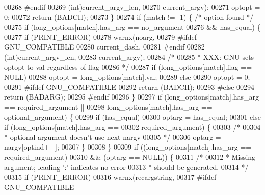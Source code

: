 \begin{DoxyCode}
{{{{{{{{{{{00268 #endif
00269                  (\textcolor{keywordtype}{int})current\_argv\_len,
00270                  current\_argv);
00271         optopt = 0;
00272         \textcolor{keywordflow}{return} (BADCH);
00273     \}
00274     \textcolor{keywordflow}{if} (match != -1) \{      \textcolor{comment}{/* option found */}
00275         \textcolor{keywordflow}{if} (long\_options[match].has\_arg == no\_argument
00276             && has\_equal) \{
00277             \textcolor{keywordflow}{if} (PRINT\_ERROR)
00278                 warnx(noarg,
00279 #ifdef GNU\_COMPATIBLE
00280                      current\_dash,
00281 #endif
00282                      (\textcolor{keywordtype}{int})current\_argv\_len,
00283                      current\_argv);
00284             \textcolor{comment}{/*}
00285 \textcolor{comment}{             * XXX: GNU sets optopt to val regardless of flag}
00286 \textcolor{comment}{             */}
00287             \textcolor{keywordflow}{if} (long\_options[match].flag == NULL)
00288                 optopt = long\_options[match].val;
00289             \textcolor{keywordflow}{else}
00290                 optopt = 0;
00291 \textcolor{preprocessor}{#ifdef GNU\_COMPATIBLE}
00292             \textcolor{keywordflow}{return} (BADCH);
00293 \textcolor{preprocessor}{#else}
00294             \textcolor{keywordflow}{return} (BADARG);
00295 \textcolor{preprocessor}{#endif}
00296         \}
00297         \textcolor{keywordflow}{if} (long\_options[match].has\_arg == required\_argument ||
00298             long\_options[match].has\_arg == optional\_argument) \{
00299             \textcolor{keywordflow}{if} (has\_equal)
00300                 optarg = has\_equal;
00301             \textcolor{keywordflow}{else} \textcolor{keywordflow}{if} (long\_options[match].has\_arg ==
00302                 required\_argument) \{
00303                 \textcolor{comment}{/*}
00304 \textcolor{comment}{                 * optional argument doesn't use next nargv}
00305 \textcolor{comment}{                 */}
00306                 optarg = nargv[optind++];
00307             \}
00308         \}
00309         \textcolor{keywordflow}{if} ((long\_options[match].has\_arg == required\_argument)
00310             && (optarg == NULL)) \{
00311             \textcolor{comment}{/*}
00312 \textcolor{comment}{             * Missing argument; leading ':' indicates no error}
00313 \textcolor{comment}{             * should be generated.}
00314 \textcolor{comment}{             */}
00315             \textcolor{keywordflow}{if} (PRINT\_ERROR)
00316                 warnx(recargstring,
00317 #ifdef GNU\_COMPATIBLE
}}}}}}}}}}}
\end{DoxyCode}
